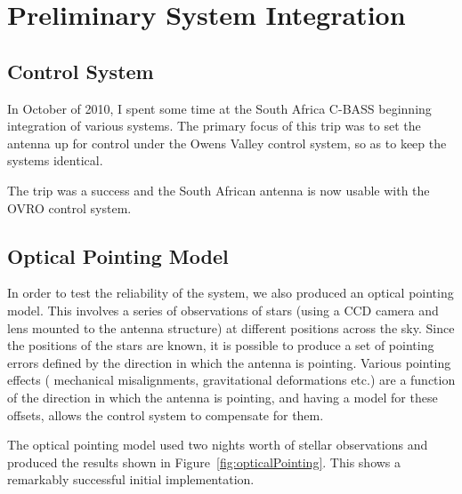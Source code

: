 \section{Preliminary System Integration}

\subsection{Control System}
In October of 2010, I spent some time at the South Africa C-BASS beginning integration of various systems. The primary focus of this trip was to set the antenna up for control under the Owens Valley control system, so as to keep the systems identical. 

The trip was a success and the South African antenna is now usable with the OVRO control system. 

\subsection{Optical Pointing Model}
In order to test the reliability of the system, we also produced an optical pointing model. This involves a series of observations of stars (using a CCD camera and lens mounted to the antenna structure) at different positions across the sky. Since the positions of the stars are known, it is possible to produce a set of pointing errors defined by the direction in which the antenna is pointing. Various pointing effects ( mechanical misalignments, gravitational deformations etc.) are a function of the direction in which the antenna is pointing, and having a model for these offsets, allows the control system to compensate for them.

The optical pointing model used two nights worth of stellar observations and produced the results shown in Figure~\ref{fig:opticalPointing}. This shows a remarkably successful initial implementation.


